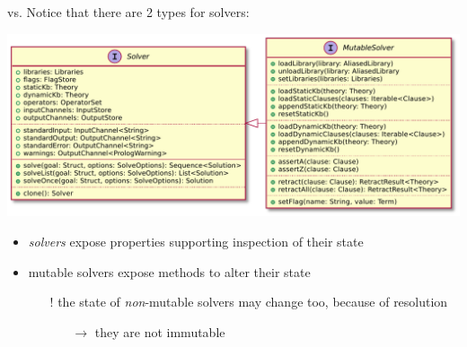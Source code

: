 \documentclass[handout]{beamer}
\begin{document}
\begin{frame}[allowframebreaks]{ vs. }
    Notice that there are 2 types for solvers:
    \begin{center}
        \includegraphics[width=.8\linewidth]{img/solve-mutable.pdf}
    \end{center}
    \begin{itemize}\small
        \item \emph{solvers} expose properties supporting \alert{inspection} of their state
        \item \alert{mutable} solvers expose methods to \alert{alter} their state
        \begin{itemize}
            \item[!] the state of \emph{non}-mutable solvers may change too, because of resolution
            \begin{itemize}
                \item[$\rightarrow$] they are \alert{not} immutable
            \end{itemize}
        \end{itemize}
    \end{itemize}
\end{frame}
\end{document}
